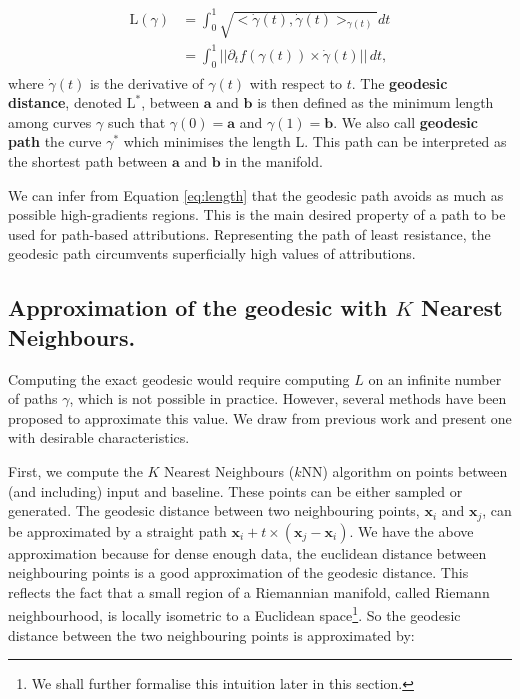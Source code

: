 \begin{align}
\begin{split}
    \textrm{L}(\gamma) &= \int_0^1 \sqrt{<\dot \gamma(t), \dot \gamma(t)>_{\gamma(t)}}dt \\
    &= \int_0^1 ||\partial_t f(\gamma(t)) \times \dot\gamma(t)|| \, dt,
\end{split}
\label{eq:length}
\end{align}
where $\dot\gamma(t)$ is the derivative of $\gamma(t)$ with respect to $t$.
The \textbf{geodesic distance}, denoted $\textrm{L}^*$, between $\textbf{a}$ and $\textbf{b}$ is then defined as the minimum length among curves $\gamma$ such that $\gamma(0) = \textbf{a}$ and $\gamma(1) = \textbf{b}$. We also call \textbf{geodesic path} the curve $\gamma^*$ which minimises the length L. This path can be interpreted as the shortest path between $\textbf{a}$ and $\textbf{b}$ in the manifold. 

\begin{remark}
\label{rem:shortest}
We can infer from Equation \ref{eq:length} that the geodesic path avoids as much as possible high-gradients regions. This is the main desired property of a path to be used for path-based attributions. Representing the path of least resistance, the geodesic path circumvents superficially high values of attributions.
\end{remark}

\subsection{Approximation of the geodesic with $K$ Nearest Neighbours.} Computing the exact geodesic would require computing $L$ on an infinite number of paths $\gamma$, which is not possible in practice. However, several methods have been proposed to approximate this value. We draw from previous work \citep{yang2018geodesic, chen2019fast} and present one with desirable characteristics.

First, we compute the $K$ Nearest Neighbours ($k$NN) algorithm on points between (and including) input and baseline. These points can be either sampled or generated. The geodesic distance between two neighbouring points, $\textbf{x}_i$ and $\textbf{x}_j$, can be approximated by a straight path $\textbf{x}_i + t \times (\textbf{x}_j - \textbf{x}_i)$. We have the above approximation because for dense enough data, the euclidean distance between neighbouring points is a good approximation of the geodesic distance. This reflects the fact that a small region of a Riemannian manifold, called Riemann neighbourhood, is locally isometric to a Euclidean space\footnote{We shall further formalise this intuition later in this section.}. So the geodesic distance between the two neighbouring points is approximated by: 

